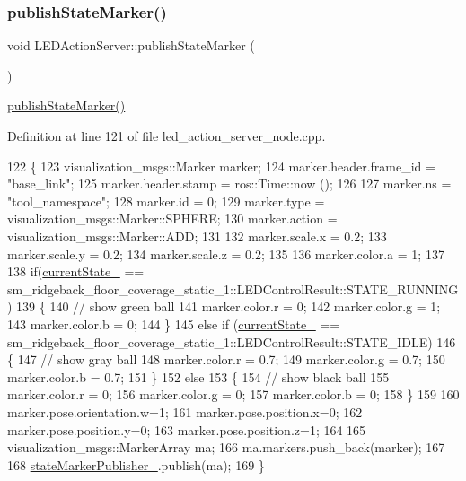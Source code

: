 \subsubsection{\texorpdfstring{publish\+State\+Marker()}{publishStateMarker()}\hspace{0.1cm}{\footnotesize\ttfamily [2/4]}}
{\footnotesize\ttfamily void L\+E\+D\+Action\+Server\+::publish\+State\+Marker (\begin{DoxyParamCaption}{ }\end{DoxyParamCaption})\hspace{0.3cm}{\ttfamily [inline]}}

\hyperlink{classLEDActionServer_a73bb754ac2347c50660624ad92315895}{publish\+State\+Marker()} 

Definition at line 121 of file led\+\_\+action\+\_\+server\+\_\+node.\+cpp.


\begin{DoxyCode}
122 \{
123     visualization\_msgs::Marker marker;
124     marker.header.frame\_id = \textcolor{stringliteral}{"base\_link"};
125     marker.header.stamp = ros::Time::now ();
126 
127     marker.ns = \textcolor{stringliteral}{"tool\_namespace"};
128     marker.id = 0;
129     marker.type = visualization\_msgs::Marker::SPHERE;
130     marker.action = visualization\_msgs::Marker::ADD;
131     
132     marker.scale.x = 0.2;
133     marker.scale.y = 0.2;
134     marker.scale.z = 0.2;
135 
136     marker.color.a = 1;
137 
138     \textcolor{keywordflow}{if}(\hyperlink{classLEDActionServer_a1dc456e987dc331501ad6ff2215661ff}{currentState\_} == sm\_ridgeback\_floor\_coverage\_static\_1::LEDControlResult::STATE\_RUNNING)
139     \{
140       \textcolor{comment}{// show green ball}
141       marker.color.r = 0;
142       marker.color.g = 1;
143       marker.color.b = 0;
144     \}
145     \textcolor{keywordflow}{else} \textcolor{keywordflow}{if} (\hyperlink{classLEDActionServer_a1dc456e987dc331501ad6ff2215661ff}{currentState\_} == 
      sm\_ridgeback\_floor\_coverage\_static\_1::LEDControlResult::STATE\_IDLE)
146     \{
147       \textcolor{comment}{// show gray ball}
148       marker.color.r = 0.7;
149       marker.color.g = 0.7;
150       marker.color.b = 0.7;
151     \}
152     \textcolor{keywordflow}{else}
153     \{
154       \textcolor{comment}{// show black ball}
155       marker.color.r = 0;
156       marker.color.g = 0;
157       marker.color.b = 0;
158     \}
159 
160     marker.pose.orientation.w=1;
161     marker.pose.position.x=0;
162     marker.pose.position.y=0;
163     marker.pose.position.z=1;
164 
165     visualization\_msgs::MarkerArray ma;
166     ma.markers.push\_back(marker);
167 
168     \hyperlink{classLEDActionServer_a4168a1e4a17eb1d65aaa059ce0c52086}{stateMarkerPublisher\_}.publish(ma);
169 \}
\end{DoxyCode}
\mbox{\label{classLEDActionServer_a73bb754ac2347c50660624ad92315895}} 
